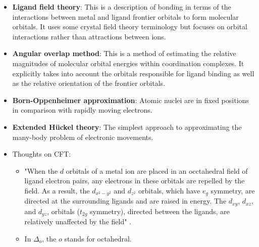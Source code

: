 \documentclass[../notes.tex]{subfiles}
\begin{document}
\begin{itemize}
    \item \textbf{Ligand field theory}: This is a description of bonding in terms of the interactions between metal and ligand frontier orbitals to form molecular orbitals. It uses some crystal field theory terminology but focuses on orbital interactions rather than attractions between ions.
    \item \textbf{Angular overlap method}: This is a method of estimating the relative magnitudes of molecular orbital energies within coordination complexes. It explicitly takes into account the orbitals responsible for ligand binding as well as the relative orientation of the frontier orbitals.
    \item \textbf{Born-Oppenheimer approximation}: Atomic nuclei are in fixed positions in comparison with rapidly moving electrons.
    \item \textbf{Extended H\"{u}ckel theory}: The simplest approach to approximating the many-body problem of electronic movements.
    \pagebreak
    \item Thoughts on CFT:
    \begin{itemize}
        \item "When the $d$ orbitals of a metal ion are placed in an occtahedral field of ligand electron pairs, any electrons in these orbitals are repelled by the field. As a result, the $d_{x^2-y^2}$ and $d_{z^2}$ orbitals, which have $e_g$ symmetry, are directed at the surrounding ligands and are raised in energy. The $d_{xy}$, $d_{xz}$, and $d_{yz}$, orbitals ($t_{2g}$ symmetry), directed between the ligands, are relatively unaffected by the field" \parencite[364]{bib:MiesslerFischerTarr}.
        \item In $\Delta_o$, the $o$ stands for octahedral.
        \begin{figure}[h!]
            \centering
\end{figure}
\end{itemize}
\end{itemize}
\end{document}
